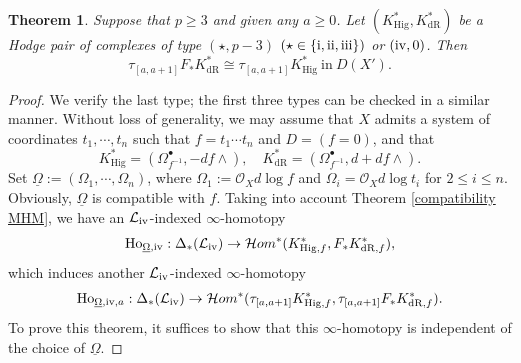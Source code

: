 \documentclass[12pt, a4paper]{article}
\newtheorem{theorem}{Theorem}[section]
\begin{document}
\begin{theorem}\label{two sided truncation}
Suppose that $p\geq 3$ and given any $a\geq0$. Let $(K^*_\mathrm{Hig},K^*_\mathrm{dR})$ be a Hodge pair of complexes of type $(\star,p-3)$ $(\star\in\{\mathrm{\uppercase\expandafter{\romannumeral1}}, \mathrm{\uppercase\expandafter{\romannumeral2}} 
 ,\mathrm{\uppercase\expandafter{\romannumeral3}}\})$ or $(\mathrm{\uppercase\expandafter{\romannumeral4}},0)$. Then
$$
\tau_{[a,a+1]}F_*K^*_\mathrm{dR}\cong \tau_{[a,a+1]}K^*_\mathrm{Hig}~\mathrm{in}~D(X').
$$
\end{theorem}
\begin{proof}
We verify the last type; the first three types can be checked in a similar manner. Without loss of generality, we may assume that \( X \) admits a system of coordinates \( t_1, \cdots, t_n \) such that \( f = t_1 \cdots t_n \) and \( D = (f = 0) \), and that
\[
K^*_{\mathrm{Hig}} = (\Omega^\bullet_{f^{-1}}, -df \wedge), \quad K^*_{\mathrm{dR}} = (\Omega^\bullet_{f^{-1}}, d + df \wedge).
\]
Set $\underline\Omega:=(\Omega_1,\cdots,\Omega_n)$, where $\Omega_1:=\mathcal O_Xd\log f$ and $\Omega_i=\mathcal O_Xd\log t_i$ for $2\leq i\leq n$. Obviously, $\underline\Omega$ is compatible with $f$. Taking into account Theorem \ref{compatibility MHM}, we have an \( \mathcal{L}_{\mathrm{\uppercase\expandafter{\romannumeral4}}} \)-indexed \( \infty \)-homotopy
$$
\mathrm{Ho}_{\underline\Omega,\mathrm{\uppercase\expandafter{\romannumeral4}}}:\Delta_*(\mathcal L_\mathrm{\uppercase\expandafter{\romannumeral4}})\to\mathcal Hom^*(K^*_{\mathrm{Hig},f},F_*K^*_{\mathrm{dR},f}),
$$
which induces another \( \mathcal{L}_{\mathrm{\uppercase\expandafter{\romannumeral4}}} \)-indexed \( \infty \)-homotopy
$$
\mathrm{Ho}_{\underline\Omega,\mathrm{\uppercase\expandafter{\romannumeral4}},a}:\Delta_*(\mathcal L_\mathrm{\uppercase\expandafter{\romannumeral4}})\to\mathcal Hom^*(\tau_{[a,a+1]}K^*_{\mathrm{Hig},f},\tau_{[a,a+1]}F_*K^*_{\mathrm{dR},f}).
$$
To prove this theorem, it suffices to show that this $\infty$-homotopy is independent of the choice of $\underline\Omega$.


\end{proof}
\end{document}
